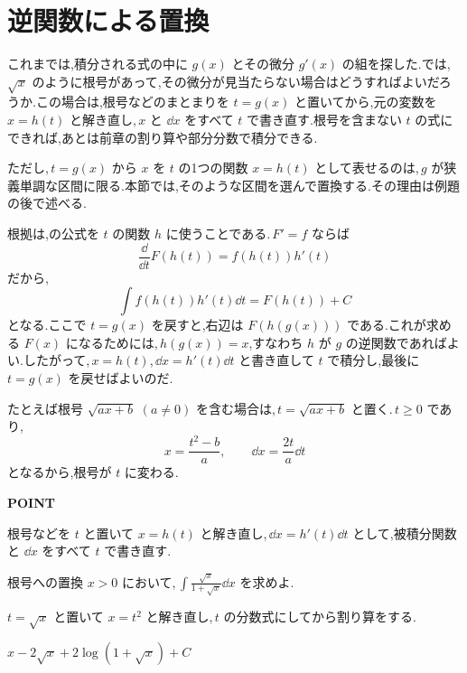 \section{逆関数による置換}\label{節:逆向きの置換}

これまでは,積分される式の中に $g(x)$ とその微分 $g'(x)$ の組を探した.では,\,$\sqrt{x}$ のように根号があって,その微分が見当たらない場合はどうすればよいだろうか.この場合は,根号などのまとまりを $t=g(x)$ と置いてから,元の変数を $x=h(t)$ と解き直し,\,$x$ と $\dd x$ をすべて $t$ で書き直す.根号を含まない $t$ の式にできれば,あとは前章の割り算や部分分数で積分できる.

ただし,\,$t=g(x)$ から $x$ を $t$ の1つの関数 $x=h(t)$ として表せるのは,\,$g$ が狭義単調な区間に限る.本節では,そのような区間を選んで置換する.その理由は例題の後で述べる.

根拠は,の公式を $t$ の関数 $h$ に使うことである.\,$F'=f$ ならば
\[
 \frac{\dd}{\dd t}F(h(t))=f(h(t))h'(t)
\]
だから,
\[
 \int f(h(t))h'(t)\dd t=F(h(t))+C
\]
となる.ここで $t=g(x)$ を戻すと,右辺は $F(h(g(x)))$ である.これが求める $F(x)$ になるためには,\,$h(g(x))=x$,すなわち $h$ が $g$ の逆関数であればよい.したがって,\,$x=h(t)$,\,$\dd x=h'(t)\dd t$ と書き直して $t$ で積分し,最後に $t=g(x)$ を戻せばよいのだ.

たとえば根号 $\sqrt{ax+b}$ $(a\ne0)$ を含む場合は,\,$t=\sqrt{ax+b}$ と置く.\,$t\ge0$ であり,
\[
 x=\frac{t^2-b}a,\qquad \dd x=\frac{2t}a\dd t
\]
となるから,根号が $t$ に変わる.

\begin{bookpoint}
\textbf{POINT}\par
根号などを $t$ と置いて $x=h(t)$ と解き直し,\,$\dd x=h'(t)\dd t$ として,被積分関数と $\dd x$ をすべて $t$ で書き直す.
\end{bookpoint}

\begin{example}{根号への置換}
$x>0$ において,\,$\int\frac{\sqrt{x}}{1+\sqrt{x}}\dd x$ を求めよ.
\end{example}

$t=\sqrt{x}$ と置いて $x=t^2$ と解き直し,\,$t$ の分数式にしてから割り算をする.

$x-2\sqrt{x}+2\log(1+\sqrt{x})+C$

